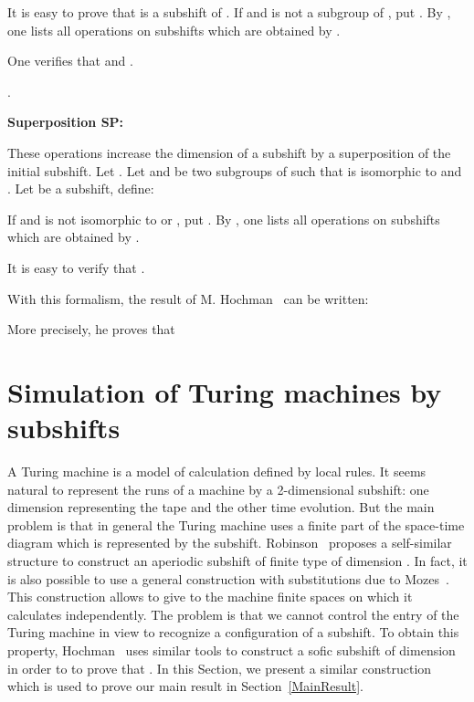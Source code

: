 \documentclass[proceedings]{stacs}
\theoremstyle{plain}\newtheorem{satz}[thm]{Satz}
\theoremstyle{definition}\newtheorem{crucial}[thm]{Crucial Definition}
\begin{document}
It is easy to prove that  is a subshift of . If  and  is not a subgroup of , put . By , one lists all operations on subshifts which are obtained by .

One verifies that  and .

\begin{theorem}\label{stabRE}
.
\end{theorem}

\noindent  \textbf{Superposition SP:}

These operations increase the dimension of a subshift by a superposition of the initial subshift. Let . Let  and  be two subgroups of  such that  is isomorphic to  and . Let  be a subshift, define:


If  and  is not isomorphic to  or , put . By , one lists all operations on subshifts which are obtained by .

It is easy to verify that .

With this formalism, the result of M. Hochman~\cite{hochman2007drp} can be written:

More precisely, he proves that 



\section{Simulation of Turing machines by subshifts}\label{TuringMachine}

A Turing machine is a model of calculation defined by local rules. It seems natural to represent the runs of a machine by a 2-dimensional subshift: one dimension representing the tape and the other time evolution. But the main problem is that in general the Turing machine uses a finite part of the space-time diagram which is represented by the subshift. Robinson~\cite{robinson1971uan} proposes a self-similar structure to construct an aperiodic subshift of finite type of dimension . In fact, it is also possible to use a general construction with substitutions due to Mozes~\cite{mozes1989tss}. This construction allows to give to the machine finite spaces on which it calculates independently. The problem is that we cannot control the entry of the Turing machine in view to recognize a configuration of a subshift. To obtain this property, Hochman~\cite{hochman2007drp} uses similar tools to construct a sofic subshift of dimension  in order to to prove that . In this Section, we present a similar construction which is used to prove our main result in Section~\ref{MainResult}.
\end{document}

